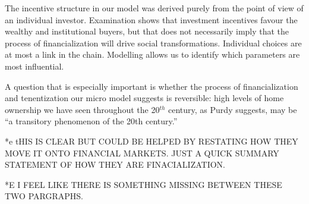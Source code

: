 The incentive structure in our model was derived purely from the point of view of an individual investor. Examination shows that investment incentives favour the wealthy and institutional buyers, but that does not necessarily imply that the process of financialization will drive social transformations. Individual choices are at most  a link in the chain. Modelling  allows us to identify which parameters are most influential. 

A question that is especially important is whether the process of financialization and tenentization our micro model suggests is reversible:  high levels of home ownership we have seen throughout the 20$^{th}$ century, as Purdy \cite{purdyPropertyOwningDemocracyHome1993} suggests, may be ``a transitory phenomenon of the 20th century.''



*e tHIS IS CLEAR BUT COULD BE HELPED BY RESTATING HOW THEY MOVE IT ONTO FINANCIAL MARKETS. JUST A QUICK SUMMARY STATEMENT OF HOW THEY ARE FINACIALIZATION. %

*E I FEEL LIKE THERE IS SOMETHING MISSING BETWEEN THESE TWO PARGRAPHS. %

